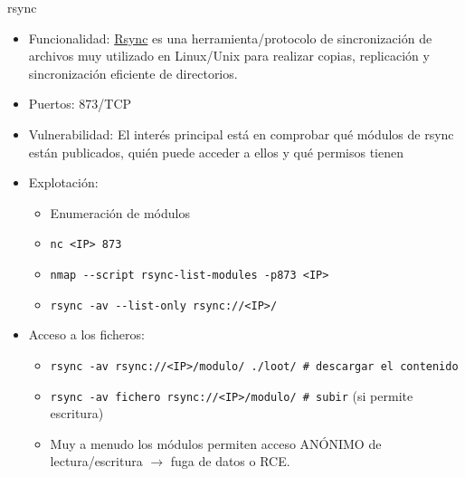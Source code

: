 \documentclass[aspectratio=169,11pt]{beamer}
\newcommand{\cmd}[1]{\texttt{#1}}
\begin{document}
\begin{frame}[allowframebreaks]{rsync}
\small
  \begin{itemize}
  \item Funcionalidad: \href{https://rsync.samba.org/}{Rsync} es una herramienta/protocolo de sincronización de archivos muy utilizado en Linux/Unix para realizar copias, replicación y sincronización eficiente de directorios.
  \item Puertos: 873/TCP
  \item Vulnerabilidad: El interés principal está en comprobar qué módulos de rsync están publicados, quién puede acceder a ellos y qué permisos tienen
  \item Explotación:
 \begin{itemize}  
  \item Enumeración de módulos
  \item \cmd{nc <IP> 873}
  \item \cmd{nmap -{}-script rsync-list-modules -p873 <IP>}
  \item \cmd{rsync -av -{}-list-only rsync://<IP>/}
  \end{itemize}

  \item Acceso a los ficheros:
   \begin{itemize}  
  \item \cmd{rsync -av rsync://<IP>/modulo/ ./loot/ \# descargar el contenido}
  \item \cmd{rsync -av fichero rsync://<IP>/modulo/ \# subir} (si permite escritura)
  \item Muy a menudo los módulos permiten acceso ANÓNIMO de lectura/escritura $\rightarrow$ fuga de datos o RCE.
  \end{itemize}

  \end{itemize}
\end{frame}

\end{document}

